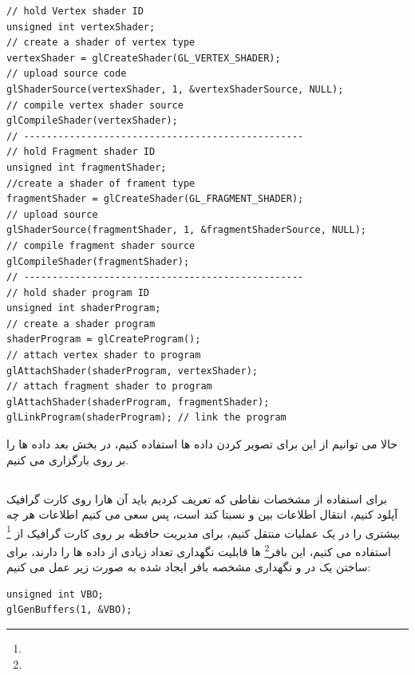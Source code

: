 \documentclass[a4paper, 12pt]{report}
\newcommand{\lrit}[1]{\lr{\textit{#1}}}
\begin{document}
    \begin{LTR}
    \small
        \begin{lstlisting}[style=C++Style,caption=\lrit{compile and link shaders to shader program}]
// hold Vertex shader ID
unsigned int vertexShader;
// create a shader of vertex type
vertexShader = glCreateShader(GL_VERTEX_SHADER);
// upload source code
glShaderSource(vertexShader, 1, &vertexShaderSource, NULL);
// compile vertex shader source
glCompileShader(vertexShader);
// -------------------------------------------------
// hold Fragment shader ID
unsigned int fragmentShader;
//create a shader of frament type
fragmentShader = glCreateShader(GL_FRAGMENT_SHADER);
// upload source
glShaderSource(fragmentShader, 1, &fragmentShaderSource, NULL);
// compile fragment shader source
glCompileShader(fragmentShader);
// -------------------------------------------------
// hold shader program ID
unsigned int shaderProgram;
// create a shader program
shaderProgram = glCreateProgram();
// attach vertex shader to program
glAttachShader(shaderProgram, vertexShader);
// attach fragment shader to program
glAttachShader(shaderProgram, fragmentShader);
glLinkProgram(shaderProgram); // link the program
        \end{lstlisting}
    \end{LTR}
    \normalsize
    \vspace*{0.3cm}

    حالا می توانیم از این  برای تصویر کردن داده ها استفاده کنیم، در بخش بعد داده ها را بر روی  بارگزاری می کنیم.

\newpage
\subsection{}
\noindent
\normalsize
    برای استفاده از مشخصات نقاطی که تعریف کردیم باید آن هارا روی  کارت گرافیک آپلود کنیم، انتقال اطلاعات بین  و  نسبتا کند است، پس سعی می کنیم اطلاعات هر چه بیشتری را در یک عملیات منتقل کنیم، برای مدیریت حافظه بر روی کارت گرافیک از \footnote{} استفاده می کنیم، این بافر\footnote{} ها قابلیت نگهداری تعداد زیادی از داده ها را دارند، برای ساختن یک  در  و نگهداری مشخصه بافر ایجاد شده به صورت زیر عمل می کنیم:

    \begin{LTR}
    \small
        \begin{lstlisting}[style=C++Style,caption=\lrit{creating a buffer object}]
unsigned int VBO;
glGenBuffers(1, &VBO);
        \end{lstlisting}
    \end{LTR}
    \normalsize
    \vspace*{0.3cm}
\end{document}
